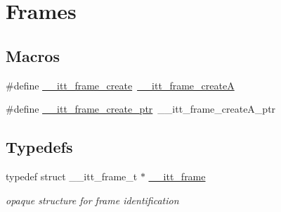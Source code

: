 \hypertarget{group__frames}{\section{Frames}
\label{group__frames}
}
\subsection*{Macros}
\begin{DoxyCompactItemize}
\item 
\#define \hyperlink{group__frames_ga0f3e51aaf74b13975eec5f29533cc442}{\-\_\-\-\_\-itt\-\_\-frame\-\_\-create}~\hyperlink{group__frames_ga8b106f002c9f1ed6e17d5833e8200ff0}{\-\_\-\-\_\-itt\-\_\-frame\-\_\-create\-A}
\item 
\#define \hyperlink{group__frames_ga45e4c9f633e550e222d510aef5616283}{\-\_\-\-\_\-itt\-\_\-frame\-\_\-create\-\_\-ptr}~\-\_\-\-\_\-itt\-\_\-frame\-\_\-create\-A\-\_\-ptr
\end{DoxyCompactItemize}
\subsection*{Typedefs}
\begin{DoxyCompactItemize}
\item 
typedef struct \-\_\-\-\_\-itt\-\_\-frame\-\_\-t $\ast$ \hyperlink{group__frames_gad1b74516ce88dc28bff032244625c7c2}{\-\_\-\-\_\-itt\-\_\-frame}
\begin{DoxyCompactList}\small\item\em opaque structure for frame identification \end{DoxyCompactList}\end{DoxyCompactItemize}

